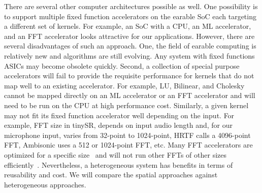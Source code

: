 There are several other computer architectures possible as well. One
possibility is to support multiple fixed function accelerators on the earable
SoC each targeting a different set of kernels. For example, an SoC with a CPU,
an ML accelerator, and an FFT accelerator looks attractive for our
applications. However, there are several disadvantages of such an approach.
One, the field of earable computing is relatively new and algorithms are still
evolving. Any system with fixed functions ASICs may become obsolete quickly.
Second,  a collection of special purpose accelerators will fail to provide the
requisite performance for kernels that do not map well to an existing
accelerator. For example, LU, Bilinear, and Cholesky cannot be mapped directly
on an ML accelerator or an FFT accelerator and will need to be run on the CPU
at high performance cost. Similarly, a given kernel may not fit its fixed
function accelerator well depending on the input. For example, FFT size in
tinySR, depends on input audio length and, for our microphone input, varies
from 32-point to 1024-point, HRTF calls a 4096-point FFT, Ambisonic uses a 512
or 1024-point FFT, etc. Many FFT accelerators are optimized for a specific
size~\cite{fft01} and will not run other FFTs of other sizes
efficiently~\cite{fft02}. Nevertheless, a heterogeneous system has benefits in
terms of reusability and cost. We will compare the spatial approaches against
heterogeneous approaches.

